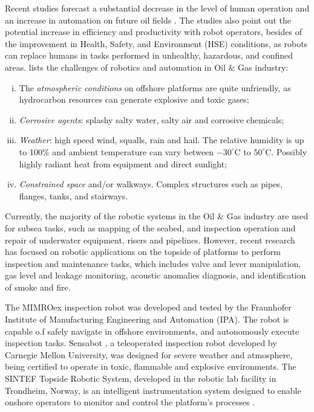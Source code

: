 Recent studies forecast a substantial decrease in the level of human operation
and an increase in automation on future oil fields .
The studies also point out the potential increase
in efficiency and productivity with robot operators, besides of the improvement in
Health, Safety, and Environment (HSE) conditions, as robots can replace humans
in tasks performed in unhealthy, hazardous, and confined areas.
lists the challenges of robotics and automation in Oil
\& Gas industry:%

\begin{enumerate}[i)]
\item The \emph{atmospheric conditions} on offshore platforms are quite unfriendly, as
hydrocarbon resources can generate explosive and toxic gases;\\ %
\item \emph{Corrosive agents}: splashy salty water, salty air and corrosive chemicals;\\
\item \emph{Weather}: high speed wind, squalls, rain and hail. The relative humidity is up to
100\% and ambient temperature can vary between $-30^{\circ}$C to $50^{\circ}$C. Possibly highly radiant heat from equipment and direct sunlight;\\
\item \emph{Constrained space} and/or walkways. Complex structures such as pipes,
flanges, tanks, and stairways.
\end{enumerate}


Currently, the majority of the robotic systems in the Oil \& Gas industry are
used for subsea tasks, such as mapping of the seabed, and inspection operation
and repair of underwater equipment, risers and pipelines. However, recent research has focused on robotic applications on the topside of platforms to perform inspection and maintenance tasks, which includes valve and lever manipulation, gas level and leakage monitoring, acoustic anomalies diagnosis, and identification of smoke and fire.

The MIMROex inspection robot  was developed and
tested by the Fraunhofer Institute of Manufacturing Engineering and Automation
(IPA). The robot is capable o.f safely navigate in offshore environments, and
autonomously execute inspection tasks. Sensabot , a
teleoperated inspection robot developed by Carnegie Mellon University, was
designed for severe weather and atmosphere, being certified to operate in toxic, flammable and explosive environments. The SINTEF Topside Robotic System, developed in the robotic lab facility in
Trondheim, Norway, is an intelligent instrumentation system designed to enable onshore operators
to monitor and control the platform's processes .


